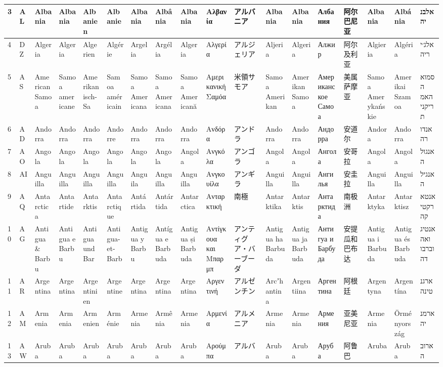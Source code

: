 \begin{longtable}{|l|l|l|l|l|l|l|l|l|l|l|l|l|l|l|l|l|l|}
3 & AL & Albania & Albania & Albanien & Albanie & Albania & Albânia & Albania & Αλβανία & アルバニア & Albania & Albania & Албания & 阿尔巴尼亚 & Albania & Albánia & אלבניה \\ \hline 
4 & DZ & Algeria & Algeria & Algerien & Algérie & Argelia & Argélia & Algeria & Αλγερία & アルジェリア & Aljeria & Algeria & Алжир & 阿尔及利亚 & Algieria & Algéria & אלג׳יריה \\ \hline 
5 & AS & American Samoa & Samoa americane & Amerikanisch-Sa & Samoa américain & Samoa Americana & Samoa Americana & Samoa Americană & Αμερικανική Σαμόα & 米領サモア & Samoa Amerikan & Amerikan Samoa & Американское Самоа & 美属萨摩亚 & Samoa Amerykańskie & Amerikai Szamoa & סמואה האמריקנית \\ \hline 
6 & AD & Andorra & Andorra & Andorra & Andorre & Andorra & Andorra & Andorra & Ανδόρα & アンドラ & Andorra & Andorra & Андорра & 安道尔 & Andora & Andorra & אנדורה \\ \hline 
7 & AO & Angola & Angola & Angola & Angola & Angola & Angola & Angola & Ανγκόλα & アンゴラ & Angola & Angola & Ангола & 安哥拉 & Angola & Angola & אנגולה \\ \hline 
8 & AI & Anguilla & Anguilla & Anguilla & Anguilla & Anguila & Anguilla & Anguilla & Ανγκουίλα & アンギラ & Anguilla & Anguilla & Ангилья & 安圭拉 & Anguilla & Anguilla & אנגילה \\ \hline 
9 & AQ & Antarctica & Antartide & Antarktis & Antarctique & Antártida & Antártida & Antarctica & Ανταρκτική & 南極 & Antarktika & Antarktis & Антарктида & 南极洲 & Antarktyka & Antarktisz & אנטארקטיקה \\ \hline 
10 & AG & Antigua \& Barbu & Antigua e Barbu & Antigua und Bar & Antigua-et-Barb & Antigua y Barbu & Antígua e Barbuda & Antigua și Barbuda & Αντίγκουα και Μπαρμπ & アンティグア・バーブーダ & Antigua ha Barbuda & Antigua ja Barbuda & Антигуа и Барбуда & 安提瓜和巴布达 & Antigua i Barbuda & Antigua és Barbuda & אנטיגואה וברבודה \\ \hline 
11 & AR & Argentina & Argentina & Argentinien & Argentine & Argentina & Argentina & Argentina & Αργεντινή & アルゼンチン & Arcʼhantina & Argentiina & Аргентина & 阿根廷 & Argentyna & Argentína & ארגנטינה \\ \hline 
12 & AM & Armenia & Armenia & Armenien & Arménie & Armenia & Armênia & Armenia & Αρμενία & アルメニア & Armenia & Armenia & Армения & 亚美尼亚 & Armenia & Örményország & ארמניה \\ \hline 
13 & AW & Aruba & Aruba & Aruba & Aruba & Aruba & Aruba & Aruba & Αρούμπα & アルバ & Aruba & Aruba & Аруба & 阿鲁巴 & Aruba & Aruba & ארובה \\ \hline 

\end{longtable}
